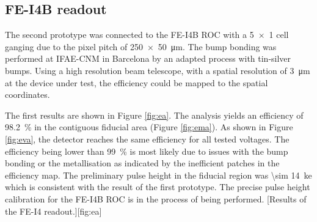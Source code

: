 \subsection{FE-I4B readout}
The second prototype was connected to the FE-I4B \ac{ROC} \cite{fei4} with a \SI{5x1}{} cell ganging due to the pixel pitch of \SI{250x50}{\micro\meter}. The bump bonding was performed at IFAE-CNM in Barcelona by an adapted process with tin-silver bumps. Using a high resolution beam telescope, with a spatial resolution of \SI{3}{\micro\meter} at the device under test, the efficiency could be mapped to the spatial coordinates. \par
The first results are shown in Figure \vref{fig:ea}. The analysis yields an efficiency of \SI{98.2}{\%} in the contiguous fiducial area (Figure \vref{fig:ema}). As shown in Figure \vref{fig:eva}, the detector reaches the same efficiency for all tested voltages. The efficiency being lower than \SI{99}{\%} is most likely due to issues with the bump bonding or the metallisation as indicated by the inefficient patches in the efficiency map. The preliminary pulse height in the fiducial region was \SI{\sim 14}{\kilo e} which is consistent with the result of the first prototype. The precise pulse height calibration for the FE-I4B \ac{ROC} is in the process of being performed.
[Results of the FE-I4 readout.][fig:ea]
